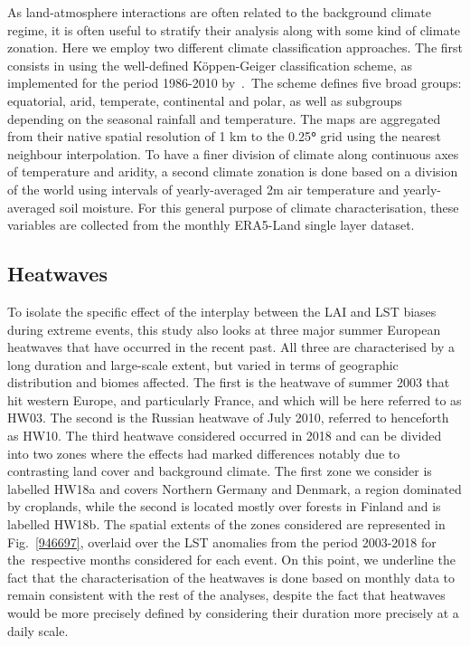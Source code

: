 \documentclass[gmd, manuscript]{copernicus}
\begin{document}
As land-atmosphere interactions are often related to the background
climate regime, it is often useful to stratify their analysis along with
some kind of climate zonation. Here we employ two different climate
classification approaches. The first consists in using the well-defined
Köppen-Geiger classification scheme, as implemented for the period
1986-2010 by~\citep{Kottek_2006}.~The scheme defines five broad groups:
equatorial, arid, temperate, continental and polar, as well as subgroups
depending on the seasonal rainfall and temperature. The maps are
aggregated from their native spatial resolution of 1 km to the
0.25\textbf{°} grid using the nearest neighbour interpolation. To have
a finer division of climate along continuous axes of temperature and
aridity, a second climate zonation is done based on a division of the
world using intervals of yearly-averaged 2m air temperature and
yearly-averaged soil moisture. For this general purpose of climate
characterisation, these variables are collected from the monthly
ERA5-Land single layer dataset.~


\subsection{Heatwaves}

To isolate the specific effect of the interplay between the LAI and LST
biases during extreme events, this study also looks at three major
summer European heatwaves that have occurred in the recent past. All
three are characterised by a long duration and large-scale extent, but
varied in terms of geographic distribution and biomes affected. The
first is the heatwave of summer 2003 that hit western Europe, and
particularly France, and which will be here referred to as HW03. The
second is the Russian heatwave of July 2010, referred to henceforth as
HW10. The third heatwave considered occurred in 2018 and can be divided
into two zones where the effects had marked differences notably due to
contrasting land cover and background climate. The first zone we
consider is labelled HW18a and covers Northern Germany and Denmark, a
region dominated by croplands, while the second is located mostly over
forests in Finland and is labelled HW18b. The spatial extents of the
zones considered are represented in
Fig.~{\ref{946697}}, overlaid over the LST anomalies
from the period 2003-2018 for the~respective months considered for each
event. On this point, we underline the fact that the characterisation of
the heatwaves is done based on monthly data to remain consistent with
the rest of the analyses, despite the fact that heatwaves would be more
precisely defined by considering their duration more precisely at a
daily scale.
\end{document}
